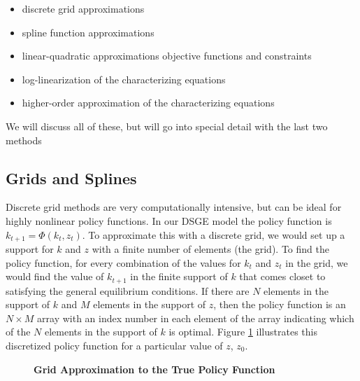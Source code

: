 \documentclass[letterpaper,12pt]{article}
\theoremstyle{definition}
\begin{document}
\begin{spacing}{1.5}
	\begin{itemize}
	\item discrete grid approximations
	\item spline function approximations
	\item linear-quadratic approximations objective functions and constraints
	\item log-linearization of the characterizing equations
	\item higher-order approximation of the characterizing equations
	\end{itemize}

	We will discuss all of these, but will go into special detail with the last two methods

	\subsection{Grids and Splines}\label{DSGE_GridSplineSoll}
		Discrete grid methods are very computationally intensive, but can be ideal for highly nonlinear policy functions.  In our DSGE model the policy function is $k_{t+1} = \Phi(k_t,z_t)$.  To approximate this with a discrete grid, we would set up a support for $k$ and $z$ with a finite number of elements (the grid).  To find the policy function, for every combination of the values for $k_t$ and $z_t$ in the grid, we would find the value of $k_{t+1}$ in the finite support of $k$ that comes closet to satisfying the general equilibrium conditions.  If there are $N$ elements in the support of $k$ and $M$ elements in the support of $z$, then the policy function is an $N\times M$ array with an index number in each element of the array indicating which of the $N$ elements in the support of $k$ is optimal.  Figure \ref{DSGE_Grid_Fig} illustrates this discretized policy function for a particular value of $z$, $z_0$.

		\begin{figure}[htb]\centering \captionsetup{width=4.0in}
		   \caption{\textbf{Grid Approximation to the True Policy Function}}
		   \label{DSGE_Grid_Fig}
		\end{figure}


\end{spacing}
\end{document}
